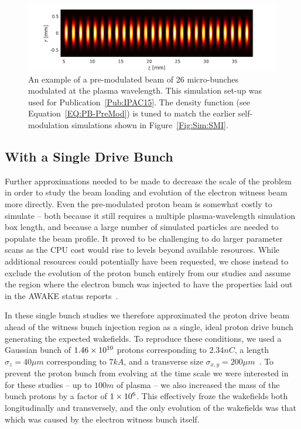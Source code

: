 \begin{figure}[hbt]
    \centering
    \includegraphics[width=0.9375\linewidth,trim={0mm 0mm 0mm 0mm},clip]{figures/PBPreMod}
    \caption{\label{Fig:PBPreMod}
        An example of a pre-modulated beam of 26 micro-bunches modulated at the plasma wavelength.
        This simulation set-up was used for Publication~\ref{Pub:IPAC15}.
        The density function (see Equation~\ref{EQ:PB-PreMod}) is tuned to match the earlier self-modulation simulations shown in Figure~\ref{Fig:Sim:SMI}.
    }
\end{figure}


\subsection{With a Single Drive Bunch}
\label{Sim:PBSingle}

Further approximations needed to be made to decrease the scale of the problem in order to study the beam loading and evolution of the electron witness beam more directly.
Even the pre-modulated proton beam is somewhat costly to simulate -- both because it still requires a multiple plasma-wavelength simulation box length, and because a large number of simulated particles are needed to populate the beam profile.
It proved to be challenging to do larger parameter scans as the CPU cost would rise to levels beyond available resources.
While additional resources could potentially have been requested, we chose instead to exclude the evolution of the proton bunch entirely from our studies and assume the region where the electron bunch was injected to have the properties laid out in the AWAKE status reports~\cite{awake_collaboration:2016}.

In these single bunch studies we therefore approximated the proton drive beam ahead of the witness bunch injection region as a single, ideal proton drive bunch generating the expected wakefields.
To reproduce these conditions, we used a Gaussian bunch of $1.46\times 10^{10}$ protons corresponding to $2.34\unit{nC}$, a length $\sigma_{z} = 40\unit{\mu m}$ corresponding to $7\unit{kA}$, and a transverse size $\sigma_{x,y}=200\unit{\mu m}$~\cite{berglyd_olsen:2018}.
To prevent the proton bunch from evolving at the time scale we were interested in for these studies -- up to $100\unit{m}$ of plasma -- we also increased the mass of the bunch protons by a factor of $1\times 10^{6}$.
This effectively froze the wakefields both longitudinally and transversely, and the only evolution of the wakefields was that which was caused by the electron witness bunch itself.

